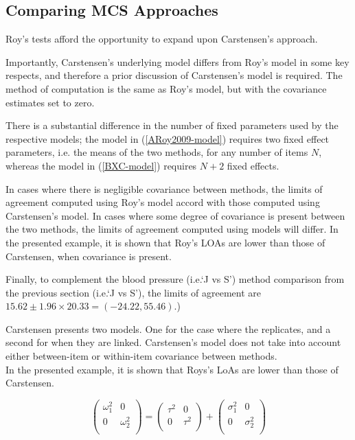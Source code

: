 \documentclass[12pt, a4paper]{report}
\theoremstyle{plain}
\theoremstyle{definition}
\theoremstyle{remark}
\begin{document}

	
	\subsection{Comparing MCS Approaches}
	Roy's tests afford the opportunity to expand upon Carstensen's approach.
	
	Importantly, Carstensen's underlying model differs from Roy's model in some key respects, and therefore a prior discussion of Carstensen's model is required. The method of computation is the
	same as Roy's model, but with the covariance estimates set to zero.
	

	
	There is a substantial difference in the number of fixed parameters used by the respective models; the model in (\ref{ARoy2009-model}) requires two fixed effect parameters, i.e. the means of the two methods, for any number of items $N$, whereas the model in (\ref{BXC-model}) requires $N+2$ fixed effects.
	
	
	In cases where there is negligible covariance between methods, the limits of agreement computed using Roy's model accord with those computed using Carstensen's model. In cases where some degree of
	covariance is present between the two methods, the limits of agreement computed using models will differ. In the presented
	example, it is shown that Roy's LOAs are lower than those of Carstensen, when covariance is present.
	

	
	Finally, to complement the blood pressure (i.e.`J vs S') method comparison from the previous section (i.e.`J vs S'), the limits of agreement are $15.62 \pm 1.96 \times 20.33 = (-24.22, 55.46)$.)
	
	Carstensen presents two models. One for the case where the replicates, and a second for when they are linked.
	Carstensen's model does not take into account either between-item or within-item covariance between methods.\\
	In the presented example, it is shown that Roys's LoAs are lower than those of Carstensen.
	
	
	
	
	\[\left(\begin{array}{cc}
	\omega^2_1  & 0 \\
	0 & \omega^2_2 \\
	\end{array}  \right)
	=  \left(
	\begin{array}{cc}
	\tau^2  & 0 \\
	0 & \tau^2 \\
	\end{array} \right)+
	\left(
	\begin{array}{cc}
	\sigma^2_1  & 0 \\
	0 & \sigma^2_2 \\
	\end{array}\right)
	\]
	
\end{document}
